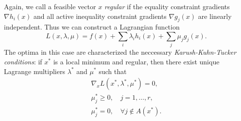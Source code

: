\documentclass{article}
\begin{document}
Again, we call a feasible vector \(x\) \emph{regular} if the equality constraint gradients \(\nabla
h_i(x)\) and all active inequality constraint gradients \(\nabla g_j(x)\) are linearly independent.
Thus we can construct a Lagrangian function
\begin{equation*}
  L(x, \lambda, \mu) = f(x) + \sum_i \lambda_i h_i(x) + \sum_j \mu_j g_j(x).
\end{equation*}
The optima in this case are characterized the neccessary \emph{Karush-Kuhn-Tucker conditions}: if
\(x^*\) is a local minimum and regular, then there exist unique Lagrange multipliers \(\lambda^*\)
and \(\mu^*\) such that
\begin{gather*}
  \nabla_x L(x^*, \lambda^*, \mu^*) = 0, \\
  \mu^*_j \geq 0, \quad j = 1, \dots, r, \\
  \mu^*_j = 0, \quad\forall j \notin A(x^*).
\end{gather*}




\end{document}
